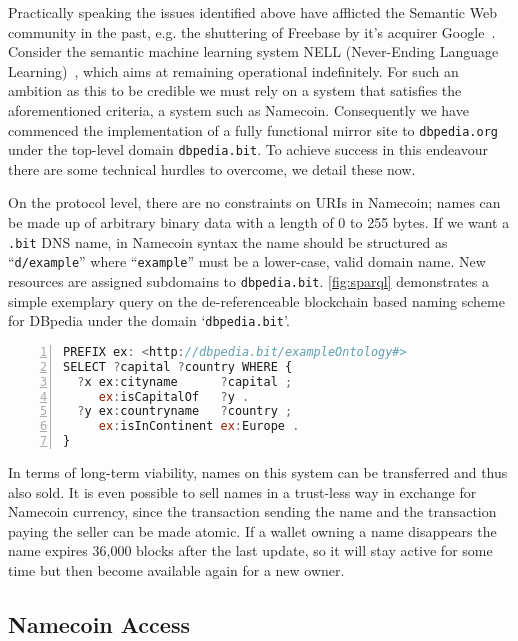 Practically speaking the issues identified above have afflicted the Semantic Web community in the past, e.g. the shuttering of Freebase by it's acquirer Google~\cite{2015}. 
Consider the semantic machine learning system NELL (Never-Ending Language Learning)~\cite{carlson2010toward}, which aims at remaining operational indefinitely. 
For such an ambition as this to be credible we must rely on a system that satisfies the aforementioned criteria, a system such as Namecoin. 
Consequently we have commenced the implementation of a fully functional mirror site to \texttt{dbpedia.org} under the top-level domain \texttt{dbpedia.bit}.
To achieve success in this endeavour there are some technical hurdles to overcome, we detail these now.  

On the protocol level, there are no constraints on URIs in Namecoin; names can be made up of arbitrary binary data with a length of 0 to 255 bytes. If we want a \texttt{.bit} DNS name, in Namecoin syntax the name should be structured as ``\texttt{d/example}'' where ``\texttt{example}'' must be a lower-case, valid domain name. 
New resources are assigned subdomains to \texttt{dbpedia.bit}. 
\autoref{fig:sparql} demonstrates a simple exemplary query on the de-referenceable blockchain based naming scheme for DBpedia under the domain `\texttt{dbpedia.bit}'.

\begin{lstlisting}[label=fig:sparql,caption=SPARQL query on \texttt{.bit} TLD,language=Javascript,basicstyle=\scriptsize \ttfamily,numbers=left,numberstyle=\tiny\color{mygray}]
PREFIX ex: <http://dbpedia.bit/exampleOntology#>
SELECT ?capital ?country WHERE {
  ?x ex:cityname      ?capital ;
     ex:isCapitalOf   ?y .
  ?y ex:countryname   ?country ;
     ex:isInContinent ex:Europe .
}
\end{lstlisting}


In terms of long-term viability, names on this system can be transferred and thus also sold. 
It is even possible to sell names in a trust-less way in exchange for Namecoin currency, since the transaction sending the name and the transaction paying the seller can be made atomic.
If a wallet owning a name disappears the name expires 36,000 blocks after the last update, so it will stay active for some time but then become available again for a new owner.

\subsection{Namecoin Access}

